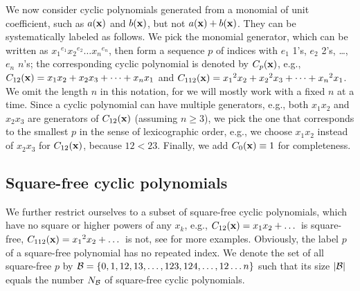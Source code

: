 \documentclass{ws-ijbc}
\begin{document}
We now consider cyclic polynomials
  generated from a monomial of unit coefficient,
  such as $a(\mathbf{x})$ and $b(\mathbf{x})$, but not $a(\mathbf{x}) + b(\mathbf{x})$.
They can be systematically labeled as follows.
We pick the monomial generator,
  which can be written as
  ${x_1}^{e_1} {x_2}^{e_2} \dots {x_n}^{e_n}$,
  then form a sequence $p$ of indices with
  $e_1$ 1's, $e_2$ 2's, \ldots, $e_n$ $n$'s;
  the corresponding cyclic polynomial is denoted by $C_p(\mathbf{x})$,
e.g.,
  $C_{12}(\mathbf{x})  = x_1 x_2 + x_2 x_3 + \dots + x_n x_1$ and
  $C_{112}(\mathbf{x}) = {x_1}^2 x_2 + {x_2}^2 x_3 + \dots + {x_n}^2 x_1$.
We omit the length $n$ in this notation,
  for we will mostly work with a fixed $n$ at a time.
Since a cyclic polynomial can have multiple generators,
  e.g., both $x_1 x_2$ and $x_2 x_3$ are generators of $C_{12}(\mathbf{x})$
   (assuming $n \ge 3$),
  we pick the one that corresponds to
  the smallest $p$
  in the sense of lexicographic order,
  e.g., we choose $x_1 x_2$ instead of $x_2 x_3$ for $C_{12}(\mathbf{x})$,
  because $12 < 23$.
Finally, we add $C_0(\mathbf{x}) \equiv 1$ for completeness.
%
%
%



\subsection{Square-free cyclic polynomials}




We further restrict ourselves to
  a subset of square-free cyclic polynomials,
  which have no square or higher powers of any $x_k$,
  e.g., $C_{12}(\mathbf{x}) = x_1 x_2 + \dots$ is square-free,
  $C_{112}(\mathbf{x}) = {x_1}^2 x_2 + \dots$ is not,
see  for more examples.
Obviously, the label $p$ of a square-free polynomial
  has no repeated index.
We denote the set of all square-free $p$ by
$\mathcal B = \{0, 1, 12, 13, \ldots, 123, 124, \ldots, 12\dots n\}$
such that its size $|\mathcal B|$ equals the number $N_\mathcal B$ of
  square-free cyclic polynomials.
\end{document}
